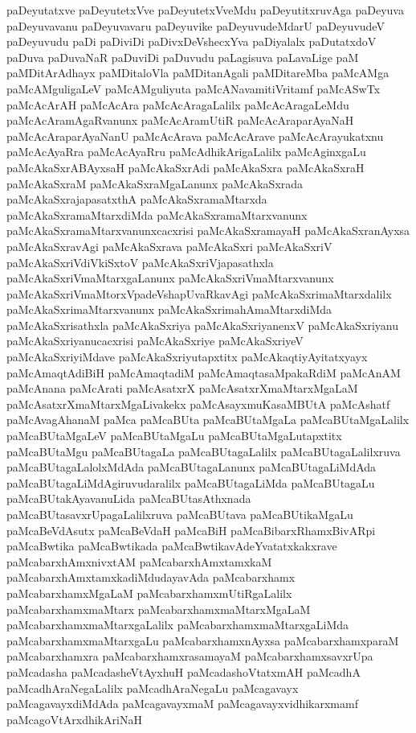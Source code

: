 {paDeyutatxve
paDeyutetxVve
paDeyutetxVveMdu
paDeyutitxruvAga
paDeyuva
paDeyuvavanu
paDeyuvavaru
paDeyuvike
paDeyuvudeMdarU
paDeyuvudeV
paDeyuvudu
paDi
paDiviDi
paDivxDeVshecxYva
paDiyalalx
paDutatxdoV
paDuva
paDuvaNaR
paDuviDi
paDuvudu
paLagisuva
paLavaLige
paM
paMDitArAdhayx
paMDitaloVla
paMDitanAgali
paMDitareMba
paMcAMga
paMcAMguligaLeV
paMcAMguliyuta
paMcANavamitiVritamf
paMcASwTx
paMcAcArAH
paMcAcAra
paMcAcAragaLalilx
paMcAcAragaLeMdu
paMcAcAramAgaRvanunx
paMcAcAramUtiR
paMcAcAraparAyaNaH
paMcAcAraparAyaNanU
paMcAcArava
paMcAcArave
paMcAcArayukatxnu
paMcAcAyaRra
paMcAcAyaRru
paMcAdhikArigaLalilx
paMcAginxgaLu
paMcAkaSxrABAyxsaH
paMcAkaSxrAdi
paMcAkaSxra
paMcAkaSxraH
paMcAkaSxraM
paMcAkaSxraMgaLanunx
paMcAkaSxrada
paMcAkaSxrajapasatxthA
paMcAkaSxramaMtarxda
paMcAkaSxramaMtarxdiMda
paMcAkaSxramaMtarxvanunx
paMcAkaSxramaMtarxvanunxcacxrisi
paMcAkaSxramayaH
paMcAkaSxranAyxsa
paMcAkaSxravAgi
paMcAkaSxrava
paMcAkaSxri
paMcAkaSxriV
paMcAkaSxriVdiVkiSxtoV
paMcAkaSxriVjapasathxla
paMcAkaSxriVmaMtarxgaLanunx
paMcAkaSxriVmaMtarxvanunx
paMcAkaSxriVmaMtorxVpadeVshapUvaRkavAgi
paMcAkaSxrimaMtarxdalilx
paMcAkaSxrimaMtarxvanunx
paMcAkaSxrimahAmaMtarxdiMda
paMcAkaSxrisathxla
paMcAkaSxriya
paMcAkaSxriyanenxV
paMcAkaSxriyanu
paMcAkaSxriyanucacxrisi
paMcAkaSxriye
paMcAkaSxriyeV
paMcAkaSxriyiMdave
paMcAkaSxriyutapxtitx
paMcAkaqtiyAyitatxyayx
paMcAmaqtAdiBiH
paMcAmaqtadiM
paMcAmaqtasaMpakaRdiM
paMcAnAM
paMcAnana
paMcArati
paMcAsatxrX
paMcAsatxrXmaMtarxMgaLaM
paMcAsatxrXmaMtarxMgaLivakekx
paMcAsayxmuKasaMBUtA
paMcAshatf
paMcAvagAhanaM
paMca
paMcaBUta
paMcaBUtaMgaLa
paMcaBUtaMgaLalilx
paMcaBUtaMgaLeV
paMcaBUtaMgaLu
paMcaBUtaMgaLutapxtitx
paMcaBUtaMgu
paMcaBUtagaLa
paMcaBUtagaLalilx
paMcaBUtagaLalilxruva
paMcaBUtagaLalolxMdAda
paMcaBUtagaLanunx
paMcaBUtagaLiMdAda
paMcaBUtagaLiMdAgiruvudaralilx
paMcaBUtagaLiMda
paMcaBUtagaLu
paMcaBUtakAyavanuLida
paMcaBUtasAthxnada
paMcaBUtasavxrUpagaLalilxruva
paMcaBUtava
paMcaBUtikaMgaLu
paMcaBeVdAsutx
paMcaBeVdaH
paMcaBiH
paMcaBibarxRhamxBivARpi
paMcaBwtika
paMcaBwtikada
paMcaBwtikavAdeYvatatxkakxrave
paMcabarxhAmxnivxtAM
paMcabarxhAmxtamxkaM
paMcabarxhAmxtamxkadiMdudayavAda
paMcabarxhamx
paMcabarxhamxMgaLaM
paMcabarxhamxmUtiRgaLalilx
paMcabarxhamxmaMtarx
paMcabarxhamxmaMtarxMgaLaM
paMcabarxhamxmaMtarxgaLalilx
paMcabarxhamxmaMtarxgaLiMda
paMcabarxhamxmaMtarxgaLu
paMcabarxhamxnAyxsa
paMcabarxhamxparaM
paMcabarxhamxra
paMcabarxhamxrasamayaM
paMcabarxhamxsavxrUpa
paMcadasha
paMcadasheVtAyxhuH
paMcadashoVtatxmAH
paMcadhA
paMcadhAraNegaLalilx
paMcadhAraNegaLu
paMcagavayx
paMcagavayxdiMdAda
paMcagavayxmaM
paMcagavayxvidhikarxmamf
paMcagoVtArxdhikAriNaH
}
